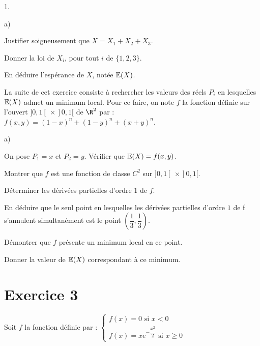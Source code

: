 \documentclass[11pt]{article}%
\begin{document}
\begin{noliste}{1.}
 \setlength{\itemsep}{4mm}
\item 

\begin{noliste}{a)}
 \setlength{\itemsep}{2mm}
\item Justifier soigneusement que $X = X_{1} + X_{2} + X_{3}.$

\item Donner la loi de $X_{i}$, pour tout $i$ de $\{1,2,3\}$.

\item En déduire l'espérance de $X$, notée $\mathbb{E}(X)$.
\end{noliste}

La suite de cet exercice consiste à rechercher les valeurs des réels
$P_{i}$
en lesquelles $\mathbb{E}(X)$ admet un minimum local. Pour ce faire, on note
$f$ la
fonction définie sur l'ouvert $]0,1[ \ \times ]0,1[$ de $\R^{2}$ par :
$f(x,y) = (1-x)^{n} + (1-y)^{n} + (x + y)^{n}$.

\item 

\begin{noliste}{a)}
 \setlength{\itemsep}{2mm}
\item On pose $P_{1} = x$ et $P_{2} = y$. Vérifier que $\mathbb{E}(X) =
f(x,y)$.

\item Montrer que $f$ est une fonction de classe $C^{2}$ sur $]0,1[ \
\times
]0,1[$.

\item Déterminer les dérivées partielles d'ordre $1$ de $f$.

\item En déduire que le seul point en lesquelles les dérivées
partielles
d'ordre $1$ de f s'annulent simultanément est le point $\left(
\dfrac{1}{3},\dfrac{1}{3}\right) $.

\item Démontrer que $f$ présente un minimum local en ce point.

\item Donner la valeur de $\mathbb{E}(X)$ correspondant à ce minimum.
\end{noliste}
\end{noliste}

\section*{Exercice 3}

Soit $f$ la fonction définie par : $\left\{ 
\begin{array}{l}
f(x) = 0\text{ si }x<0 \\
f(x) = xe^{-{\dfrac{x^{2}}{2}}}\text{ si }x\geq 0
\end{array}
\right. $
\end{document}
